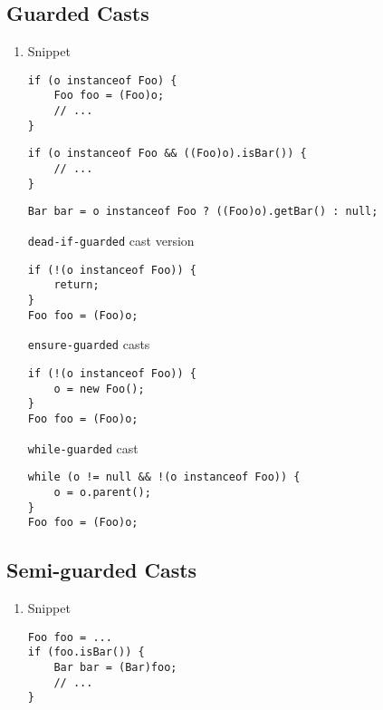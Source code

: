 \documentclass{usiinfdocprop}
\begin{document}
\subsection{Guarded Casts}
\label{sec:org378dd8a}
\begin{enumerate}
\item Snippet
\label{sec:orga9cdc90}

\lstset{language=java,label= ,caption= ,captionpos=b,numbers=none}
\begin{lstlisting}
if (o instanceof Foo) {
    Foo foo = (Foo)o;
    // ...
}
\end{lstlisting}

\lstset{language=java,label= ,caption= ,captionpos=b,numbers=none}
\begin{lstlisting}
if (o instanceof Foo && ((Foo)o).isBar()) {
    // ...
}
\end{lstlisting}

\lstset{language=java,label= ,caption= ,captionpos=b,numbers=none}
\begin{lstlisting}
Bar bar = o instanceof Foo ? ((Foo)o).getBar() : null;
\end{lstlisting}

\texttt{dead-if-guarded} cast version

\lstset{language=java,label= ,caption= ,captionpos=b,numbers=none}
\begin{lstlisting}
if (!(o instanceof Foo)) {
    return;
}
Foo foo = (Foo)o;
\end{lstlisting}

\texttt{ensure-guarded} casts

\lstset{language=java,label= ,caption= ,captionpos=b,numbers=none}
\begin{lstlisting}
if (!(o instanceof Foo)) {
    o = new Foo();
}
Foo foo = (Foo)o; 
\end{lstlisting}

\texttt{while-guarded} cast

\lstset{language=java,label= ,caption= ,captionpos=b,numbers=none}
\begin{lstlisting}
while (o != null && !(o instanceof Foo)) {
    o = o.parent();
}
Foo foo = (Foo)o;
\end{lstlisting}
\end{enumerate}

\subsection{Semi-guarded Casts}
\label{sec:org17b5842}
\begin{enumerate}
\item Snippet
\label{sec:org321c1d3}

\lstset{language=java,label= ,caption= ,captionpos=b,numbers=none}
\begin{lstlisting}
Foo foo = ...
if (foo.isBar()) {
    Bar bar = (Bar)foo;
    // ...
}
\end{lstlisting}
\end{enumerate}
\end{document}

